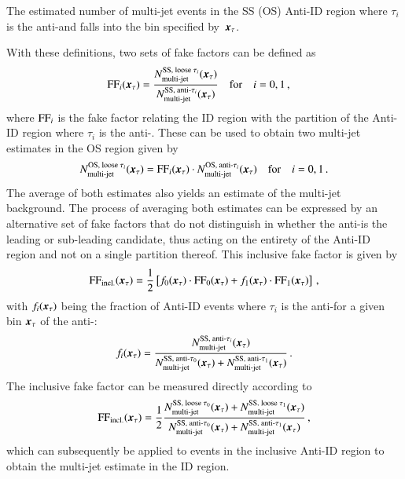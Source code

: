 {\begin{description}[style=standard]
  \item[$\NmjAntiID{SS(OS)}{i}\ffargs$] The estimated number of
    multi-jet events in the SS (OS) Anti-ID region where $\tau_i$ is
    the anti-\tauhadvis and falls into the bin specified
    by~$\myvec{x}_\tau$.
  \end{description}
  With these definitions, two sets of fake factors can be defined as
  \begin{align*}
    \FF_{i}\ffargs &= \frac{\NmjID{SS}{i} \ffargs}{\NmjAntiID{SS}{i}\ffargs}
                     \quad \text{for} \quad i = 0, 1 \,\text{,}
  \end{align*}
  where $\text{FF}_{i}$ is the fake factor relating the ID region with the
  partition of the Anti-ID region where $\tau_i$ is the
  anti-\tauhadvis. These can be used to obtain two multi-jet estimates
  in the OS region given by
  \begin{align*}
    \NmjID{OS}{i}\ffargs = \FF_{i}\ffargs \cdot \NmjAntiID{OS}{i}\ffargs
    \quad \text{for} \quad i = 0, 1 \,\text{.}
  \end{align*}
  The average of both estimates also yields an estimate of the
  multi-jet background. The process of averaging both estimates can be
  expressed by an alternative set of fake factors that do not
  distinguish in whether the anti-\tauhadvis is the leading or
  sub-leading \tauhadvis candidate, thus acting on the entirety of the
  Anti-ID region and not on a single partition thereof. This inclusive
  fake factor is given by
  \begin{align*}
    \FF_\text{incl.}\ffargs = \frac{1}{2} \left[ f_0\ffargs \cdot \FF_0\ffargs
    + f_1\ffargs \cdot \FF_1\ffargs \right] \,\text{,}
  \end{align*}
  with $f_i\ffargs$ being the fraction of Anti-ID events where
  $\tau_i$ is the anti-\tauhadvis for a given bin $\myvec{x}_\tau$ of
  the anti-\tauhadvis:
  \begin{align*}
    f_i\ffargs = \frac{\NmjAntiID{SS}{i}\ffargs}
                      {\NmjAntiID{SS}{0}\ffargs + \NmjAntiID{SS}{1}\ffargs} \,\text{.}
  \end{align*}
  The inclusive fake factor can be measured directly according to
  \begin{align}
    \FF_\text{incl.}\ffargs
    = \frac{1}{2} \frac{ \NmjID{SS}{0}\ffargs + \NmjID{SS}{1}\ffargs }
                       { \NmjAntiID{SS}{0}\ffargs + \NmjAntiID{SS}{1}\ffargs } \,\text{,}
    \label{eq:inclusive_fake_factor}
  \end{align}
  which can subsequently be applied to events in the inclusive Anti-ID
  region to obtain the multi-jet estimate in the ID region.


}
